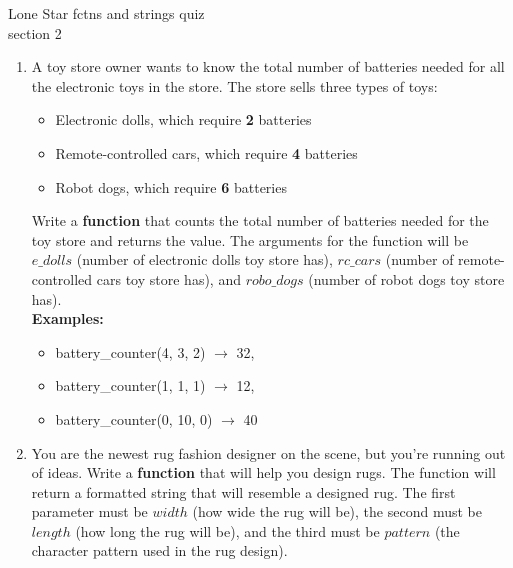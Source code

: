 \documentclass{article}
\begin{document}
\pagebreak
Lone Star \hfill fctns and strings quiz\\
section 2\\
\begin{enumerate}
	\item 
		A toy store owner wants to know the total number of batteries needed for all the electronic toys in the store. 
		The store sells three types of toys:
		\begin{itemize}
			\item Electronic dolls, which require \textbf{2} batteries
			\item Remote-controlled cars, which require \textbf{4} batteries
			\item Robot dogs, which require \textbf{6} batteries
		\end{itemize}


		Write a \textbf{function} that counts the total number of batteries needed for the toy store and returns the value. 
		The arguments for the function will be $e\_dolls$ (number of electronic dolls toy store has), $rc\_cars$ 
		(number of remote-controlled cars toy store has), and $robo\_dogs$ (number of robot dogs toy store has).\\

	\textbf{Examples:}
	\begin{itemize}
		\item  battery\_counter(4, 3, 2) $\rightarrow$ 32, 
		\item  battery\_counter(1, 1, 1) $\rightarrow$ 12, 
		\item  battery\_counter(0, 10, 0) $\rightarrow$ 40 
	\end{itemize}


	\item 
		You are the newest rug fashion designer on the scene, but you're running out of ideas. 
		Write a \textbf{function} that will help you design rugs.  The function will return a 
		formatted string that will resemble a designed rug. The first parameter must be $width$ 
		(how wide the rug will be), the second must be $length$ (how long the rug will be), 
		and the third must be $pattern$ (the character pattern used in the rug design).


\end{enumerate}
\end{document}
